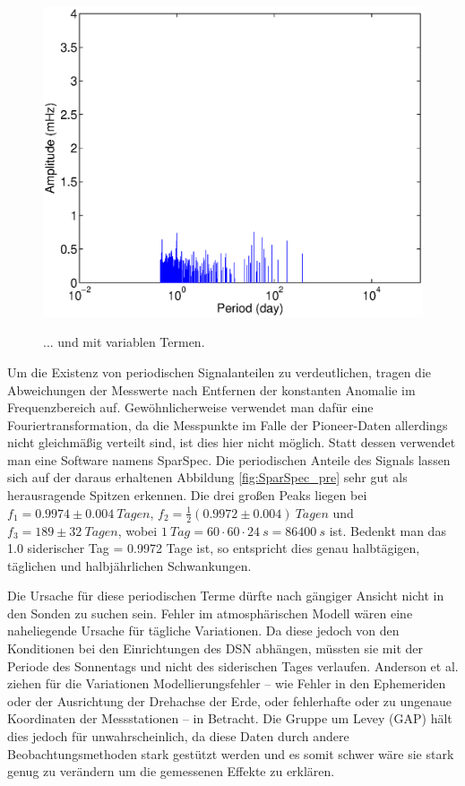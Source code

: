 \begin{figure}[htnb]
\begin{minipage}[t]{.48\linewidth}
	\includegraphics[width=\linewidth]{images/SparSpec_end}
	\label{fig:SparSpec_post}
  \caption{... und mit variablen Termen.}
\end{minipage}
 \end{figure}

Um die Existenz von periodischen Signalanteilen zu verdeutlichen, tragen die Abweichungen der Messwerte nach Entfernen der konstanten Anomalie im Frequenzbereich auf. Gewöhnlicherweise verwendet man dafür eine Fouriertransformation, da die Messpunkte im Falle der Pioneer-Daten allerdings nicht gleichmäßig verteilt sind, ist dies hier nicht möglich. Statt dessen verwendet man eine Software namens SparSpec.
Die periodischen Anteile des Signals lassen sich auf der daraus erhaltenen Abbildung \ref{fig:SparSpec_pre} sehr gut als herausragende Spitzen erkennen.
Die drei großen Peaks liegen bei $f_1=0.9974\pm0.004\ Tagen$, $f_2=\frac12(0.9972\pm0.004)\ Tagen$ und 
$f_3=189\pm32\ Tagen$, wobei $ 1\ Tag = 60 \cdot 60 \cdot 24 \:s = 86400\:s$ ist.
Bedenkt man das 1.0 siderischer Tag = 0.9972 Tage ist, so entspricht dies genau halbtägigen, täglichen und halbjährlichen Schwankungen.

Die Ursache für diese periodischen Terme dürfte nach gängiger Ansicht nicht in den Sonden zu suchen sein. Fehler im atmosphärischen Modell wären eine naheliegende Ursache für tägliche Variationen. Da diese jedoch von den Konditionen bei den Einrichtungen des DSN abhängen, müssten sie mit der Periode des Sonnentags und nicht des siderischen Tages verlaufen.\cite{Levy2009}
Anderson et al. ziehen für die Variationen Modellierungsfehler – wie Fehler in den Ephemeriden oder der Ausrichtung der Drehachse der Erde, oder fehlerhafte oder zu ungenaue Koordinaten der Messstationen – in Betracht.\cite{Levy2009}\cite{Dittus2006} %
Die Gruppe um Levey (GAP) hält dies jedoch für unwahrscheinlich, da diese Daten durch andere Beobachtungsmethoden
stark gestützt werden und es somit schwer wäre sie stark genug zu verändern um die gemessenen Effekte zu erklären. %

